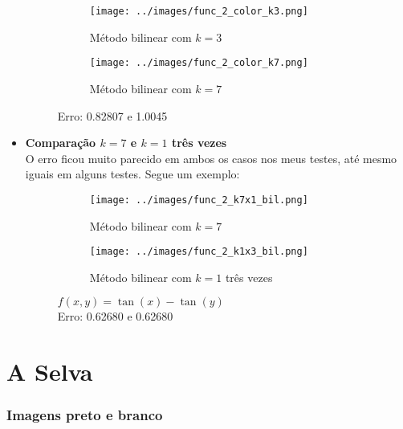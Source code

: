 \documentclass[leqno]{article}
\begin{document}
\begin{itemize}
        \begin{figure}[H]
          \centering
          \begin{subfigure}{.45\textwidth}
            \centering
            \texttt{[image: ../images/func\_2\_color\_k3.png]}
            \caption{Método bilinear com $k = 3$}
            \label{fig:sub2}
          \end{subfigure}
          \begin{subfigure}{.45\textwidth}
              \centering
              \texttt{[image: ../images/func\_2\_color\_k7.png]}
              \caption{Método bilinear com $k = 7$}
              \label{fig:sub1}
            \end{subfigure}%
          \caption{Erro: 0.82807 e 1.0045}
          \label{fig:test}
      \end{figure}

    \item \textbf{Comparação $k = 7$ e $k = 1$ três vezes} \\
        O erro ficou muito parecido em ambos os casos nos meus testes, até mesmo
        iguais em alguns testes. Segue um exemplo:

        \begin{figure}[H]
            \centering
            \begin{subfigure}{.45\textwidth}
              \centering
              \texttt{[image: ../images/func\_2\_k7x1\_bil.png]}
              \caption{Método bilinear com $k = 7$}
              \label{fig:sub2}
            \end{subfigure}
            \begin{subfigure}{.45\textwidth}
                \centering
                \texttt{[image: ../images/func\_2\_k1x3\_bil.png]}
                \caption{Método bilinear com $k = 1$ três vezes}
                \label{fig:sub1}
              \end{subfigure}%
            \caption{$f(x,y) = \tan(x) - \tan(y)$ \\ Erro: 0.62680 e 0.62680}
            \label{fig:test}
        \end{figure}
\end{itemize}


\section{A Selva}

\subsubsection*{Imagens preto e branco}
\end{document}
